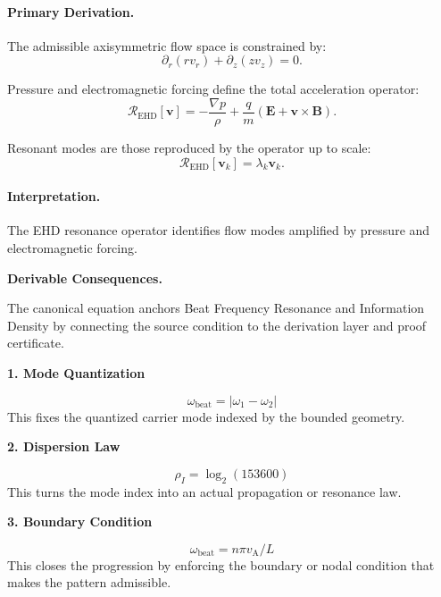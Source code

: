 \paragraph{Primary Derivation.}
The admissible axisymmetric flow space is constrained by:
\begin{equation}
\partial_r(rv_r)+\partial_z(zv_z)=0.
\end{equation}

Pressure and electromagnetic forcing define the total acceleration operator:
\begin{equation}
\mathcal{R}_{\mathrm{EHD}}[\mathbf{v}]
=
-\frac{\nabla p}{\rho}
+
\frac{q}{m}
(\mathbf{E}+\mathbf{v}\times\mathbf{B}).
\end{equation}

Resonant modes are those reproduced by the operator up to scale:
\begin{equation}
\boxed{
\mathcal{R}_{\mathrm{EHD}}[\mathbf{v}_k]
=
\lambda_k\mathbf{v}_k.
}
\end{equation}

\paragraph{Interpretation.}
The EHD resonance operator identifies flow modes amplified by pressure and electromagnetic forcing.

\par\vspace{0.35em}
\noindent\textbf{Derivable Consequences.}\quad
\begingroup
\footnotesize
\raggedright
The canonical equation anchors Beat Frequency Resonance and Information Density by connecting the source condition to the derivation layer and proof certificate.
\par\endgroup

\noindent\textbf{1. Mode Quantization}\par
\[
\omega_{\mathrm{beat}}=\lvert\omega_{1}-\omega_{2}\rvert
\]
\noindent This fixes the quantized carrier mode indexed by the bounded geometry.\par
\noindent\textbf{2. Dispersion Law}\par
\[
\rho_{I}=\log_{2}(153600)
\]
\noindent This turns the mode index into an actual propagation or resonance law.\par
\noindent\textbf{3. Boundary Condition}\par
\[
\omega_{\mathrm{beat}}=n\pi v_{\mathrm{A}}/L
\]
\noindent This closes the progression by enforcing the boundary or nodal condition that makes the pattern admissible.\par

